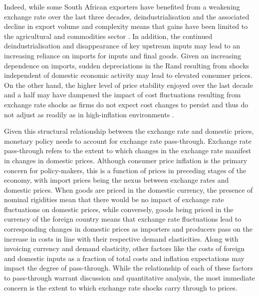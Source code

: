 \documentclass[12pt]{article}
\begin{document}
Indeed, while some South African exporters have benefited from a weakening exchange rate over the last three decades, deindustrialisation and the associated decline in export volume and complexity means that gains have been limited to the agricultural and commodities sector \parencite{stern_ramkolowan}. In addition, the continued deindustrialisation and disappearance of key upstream inputs may lead to an increasing reliance on imports for inputs and final goods. Given an increasing dependence on imports, sudden depreciations in the Rand resulting from shocks independent of domestic economic activity may lead to elevated consumer prices. On the other hand, the higher level of price stability enjoyed over the last decade and a half may have dampened the impact of cost fluctuations resulting from exchange rate shocks as firms do not expect cost changes to persist and thus do not adjust as readily as in high-inflation environments \textcite{taylor2000low}. 
 
 Given this structural relationship between the exchange rate and domestic prices, monetary policy needs to account for exchange rate pass-through. Exchange rate pass-through refers to the extent to which changes in the exchange rate manifest in changes in domestic prices. Although consumer price inflation is the primary concern for policy-makers, this is a function of prices in preceding stages of the economy, with import prices being the nexus between exchange rates and domestic prices. When goods are priced in the domestic currency, the presence of nominal rigidities mean that there would be no impact of exchange rate fluctuations on domestic prices, while conversely, goods being priced in the currency of the foreign country means that exchange rate fluctuations lead to corresponding changes in domestic prices as importers and producers pass on the increase in costs in line with their respective demand elasticities. Along with invoicing currency and demand elasticity, other factors like the costs of foreign and domestic inputs as a fraction of total costs and inflation expectations may impact the degree of pass-through. While the relationship of each of these factors to pass-through warrant discussion and quantitative analysis, the most immediate concern is the extent to which exchange rate shocks carry through to prices. 
 
\end{document}
